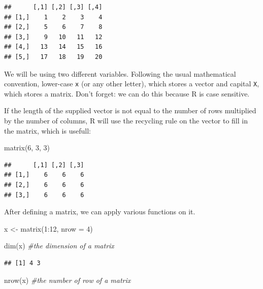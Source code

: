 \documentclass[
]{book}
\newenvironment{Shaded}{\begin{snugshade}}{\end{snugshade}}
\newcommand{\AttributeTok}[1]{\textcolor[rgb]{0.77,0.63,0.00}{#1}}
\newcommand{\CommentTok}[1]{\textcolor[rgb]{0.56,0.35,0.01}{\textit{#1}}}
\newcommand{\DecValTok}[1]{\textcolor[rgb]{0.00,0.00,0.81}{#1}}
\newcommand{\FunctionTok}[1]{\textcolor[rgb]{0.00,0.00,0.00}{#1}}
\newcommand{\NormalTok}[1]{#1}
\newcommand{\OtherTok}[1]{\textcolor[rgb]{0.56,0.35,0.01}{#1}}
\newcommand{\SpecialCharTok}[1]{\textcolor[rgb]{0.00,0.00,0.00}{#1}}
\begin{document}
\begin{verbatim}
##      [,1] [,2] [,3] [,4]
## [1,]    1    2    3    4
## [2,]    5    6    7    8
## [3,]    9   10   11   12
## [4,]   13   14   15   16
## [5,]   17   18   19   20
\end{verbatim}

We will be using two different variables. Following the usual mathematical convention, lower-case \texttt{x} (or any other letter), which stores a vector and capital \texttt{X}, which stores a matrix. Don't forget: we can do this because R is case sensitive.

If the length of the supplied vector is not equal to the number of rows multiplied by the number of columns, R will use the recycling rule on the vector to fill in the matrix, which is usefull:

\begin{Shaded}
\begin{Highlighting}[]
\FunctionTok{matrix}\NormalTok{(}\DecValTok{6}\NormalTok{, }\DecValTok{3}\NormalTok{, }\DecValTok{3}\NormalTok{)}
\end{Highlighting}
\end{Shaded}

\begin{verbatim}
##      [,1] [,2] [,3]
## [1,]    6    6    6
## [2,]    6    6    6
## [3,]    6    6    6
\end{verbatim}

After defining a matrix, we can apply various functions on it.

\begin{Shaded}
\begin{Highlighting}[]
\NormalTok{x }\OtherTok{\textless{}{-}} \FunctionTok{matrix}\NormalTok{(}\DecValTok{1}\SpecialCharTok{:}\DecValTok{12}\NormalTok{, }\AttributeTok{nrow =} \DecValTok{4}\NormalTok{)}

\FunctionTok{dim}\NormalTok{(x)            }\CommentTok{\#the dimension of a matrix         }
\end{Highlighting}
\end{Shaded}

\begin{verbatim}
## [1] 4 3
\end{verbatim}

\begin{Shaded}
\begin{Highlighting}[]
\FunctionTok{nrow}\NormalTok{(x)           }\CommentTok{\#the number of row of a matrix }
\end{Highlighting}
\end{Shaded}
\end{document}
